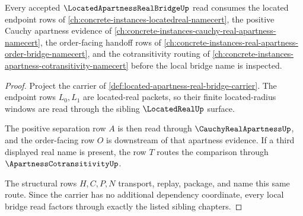 \begin{lemma}
\label{lem:located-apartness-real-bridge-sibling-dependency-route}
Every accepted $\LocatedApartnessRealBridgeUp$ read consumes the located endpoint rows of \autoref{ch:concrete-instances-locatedreal-namecert}, the positive Cauchy apartness evidence of \autoref{ch:concrete-instances-cauchy-real-apartness-namecert}, the order-facing handoff rows of \autoref{ch:concrete-instances-real-apartness-order-bridge-namecert}, and the cotransitivity routing of \autoref{ch:concrete-instances-apartness-cotransitivity-namecert} before the local bridge name is inspected.
\end{lemma}
\begin{proof}
Project the carrier of \autoref{def:located-apartness-real-bridge-carrier}. The endpoint rows $L_0,L_1$ are located-real packets, so their finite located-radius windows are read through the sibling $\LocatedRealUp$ surface.

The positive separation row $A$ is then read through $\CauchyRealApartnessUp$, and the order-facing row $O$ is downstream of that apartness evidence. If a third displayed real name is present, the row $T$ routes the comparison through $\ApartnessCotransitivityUp$.

The structural rows $H,C,P,N$ transport, replay, package, and name this same route. Since the carrier has no additional dependency coordinate, every local bridge read factors through exactly the listed sibling chapters.
\end{proof}

